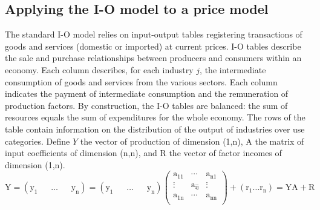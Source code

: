 \documentclass[11pt,a4paper]{article}
\begin{document}
\subsection{Applying the I-O model to a price model}
\label{subsec:ioprice}
The standard I-O model relies on input-output tables registering transactions of goods and services (domestic or imported) at current prices. I-O tables describe the sale and purchase relationships between producers and consumers within an economy. Each column describes, for each industry $j$, the intermediate consumption of goods and services from the various sectors. Each column indicates the payment of intermediate consumption and the remuneration of production factors. By construction, the I-O tables are balanced: the sum of resources equals the sum of expenditures for the whole economy. The rows of the table contain information on the distribution of the output of industries over use categories.
Define $Y$ the vector of production of dimension (1,n), A the matrix of input coefficients of dimension (n,n), and $\text{R}$ the vector of factor incomes of dimension (1,n).
	$\text{Y}=\left( {{\text{y}}_{1}}\text{ }\!\!~\!\!\text{ }\ldots \text{ }\!\!~\!\!\text{ }{{\text{y}}_{\text{n}}} \right)=\left( {{\text{y}}_{1}}\text{ }\!\!~\!\!\text{ }\ldots \text{ }\!\!~\!\!\text{ }{{\text{y}}_{\text{n}}} \right)\left( \begin{matrix}
   {{\text{a}}_{11}} & \cdots  & {{\text{a}}_{\text{n}1}}  \\
   \vdots  & {{\text{a}}_{\text{ij}}} & \vdots   \\
   {{\text{a}}_{1\text{n}}} & \cdots  & {{\text{a}}_{\text{nn}}}  \\
\end{matrix} \right)+\left( {{\text{r}}_{1}}\ldots {{\text{r}}_{\text{n}}} \right)=\text{YA}+\text{R}$
\end{document}
